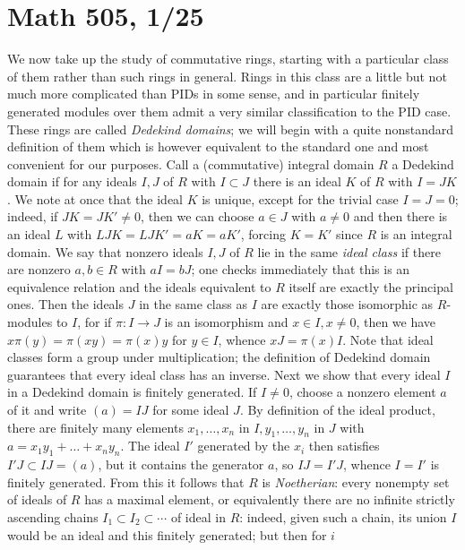 \documentclass[10pt]{article}
\begin{document}
\section*{Math 505, 1/25}

We now take up the study of commutative rings, starting with a
particular class of them rather than such rings in general. Rings in
this class are a little but not much more complicated than PIDs in some
sense, and in particular finitely generated modules over them admit a
very similar classification to the PID case. These rings are called {\sl
  Dedekind domains}; we will begin with a quite nonstandard definition
of them which is however equivalent to the standard one and most
convenient for our purposes. Call a (commutative) integral domain $R$ a
Dedekind domain if for any ideals $I,J$ of $R$ with $I\subset J$ there
is an ideal $K$ of $R$ with $I = JK$. We note at once that the ideal $K$
is unique, except for the trivial case $I = J = 0$; indeed, if $JK =
JK'\ne0$, then we can choose $a\in J$ with $a\ne0$ and then there is an
ideal $L$ with $LJK = LJK' = aK = aK'$, forcing $K = K'$ since $R$ is an
integral domain. We say that nonzero ideals $I,J$ of $R$ lie in the same
{\sl ideal class} if there are nonzero $a,b\in R$ with $aI = bJ$; one
checks immediately that this is an equivalence relation and the ideals
equivalent to $R$ itself are exactly the principal ones. Then the ideals
$J$ in the same class as $I$ are exactly those isomorphic as $R$-modules
to $I$, for if $\pi:I\rightarrow J$ is an isomorphism and $x\in
I,x\ne0$, then we have $x\pi(y) = \pi(xy) = \pi(x)y$ for $y\in I$,
whence $xJ = \pi(x)I$. Note that ideal classes form a group under
multiplication; the definition of Dedekind domain guarantees that every
ideal class has an inverse. Next we show that every ideal $I$ in a
Dedekind domain is finitely generated. If $I\ne0$, choose a nonzero
element $a$ of it and write $(a) = IJ$ for some ideal $J$. By definition
of the ideal product, there are finitely many elements $x_1,\ldots,x_n$
in $I, y_1,\ldots,y_n$ in $J$ with $a = x_1 y_1 +\ldots+ x_n y_n$. The
ideal $I'$ generated by the $x_i$ then satisfies $I'J\subset IJ = (a)$,
but it contains the generator $a$, so $IJ = I'J$, whence $I = I'$ is
finitely generated. From this it follows that $R$ is {\sl Noetherian}:
every nonempty set of ideals of $R$ has a maximal element, or
equivalently there are no infinite strictly ascending chains $I_1\subset
I_2\subset\cdots$ of ideal in $R$: indeed, given such a chain, its union
$I$ would be an ideal and this finitely generated; but then for $i$
\end{document}
